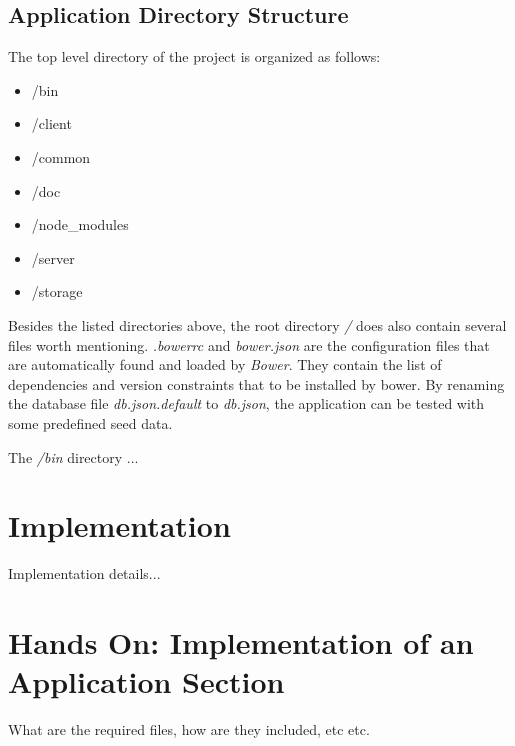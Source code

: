 \documentclass[nochapterpage,nopartpage,noheadingspace,numbersubsubsec,bigchapter,colorback,accentcolor=tud9c,10pt]{tudreport}
\begin{document}
  \section{Application Directory Structure}
  \label{sec:tech:architecture:dirs}

    The top level directory of the project is organized as follows:
        \begin{multicols}{4}

            \begin{itemize}
                \item /bin
                \item /client
                \item /common

                \item /doc
                \item /node\_modules
                \item /server

                \item /storage
            \end{itemize}
        \end{multicols}

    Besides the listed directories above, the root directory \emph{/} does also contain several files worth mentioning. \emph{.bowerrc} and \emph{bower.json} are the configuration files that are automatically found and loaded by \emph{Bower}. They contain the list of dependencies and version constraints that to be installed by bower. By renaming the database file \emph{db.json.default} to \emph{db.json}, the application can be tested with some predefined seed data.

    The \emph{/bin} directory ...

  \chapter{Implementation}
  \label{ch:tech:implementation}

    Implementation details...

  \chapter{Hands On: Implementation of an Application Section}
  \label{ch:tech:handson}

    What are the required files, how are they included, etc etc.
\end{document}
